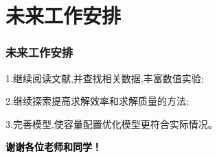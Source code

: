 \documentclass{beamer}
\begin{document}
\section{未来工作安排}
\begin{frame}
	\frametitle{未来工作安排} 
	1.继续阅读文献,并查找相关数据,丰富数值实验;

	2.继续探索提高求解效率和求解质量的方法;

	3.完善模型,使容量配置优化模型更符合实际情况。
\end{frame}

\begin{frame}
\vspace{1em}
\centering
\textcolor{black}{\LARGE\bf 谢谢各位老师和同学！}

\end{frame}
\end{document}

